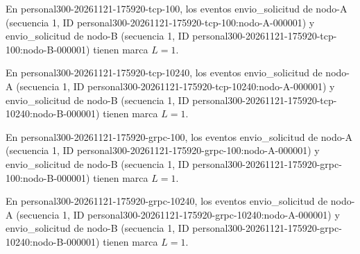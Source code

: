 En personal300-20261121-175920-tcp-100, los eventos envio\_solicitud de nodo-A (secuencia 1, ID personal300-20261121-175920-tcp-100:nodo-A-000001) y envio\_solicitud de nodo-B (secuencia 1, ID personal300-20261121-175920-tcp-100:nodo-B-000001) tienen marca $L=1$.

En personal300-20261121-175920-tcp-10240, los eventos envio\_solicitud de nodo-A (secuencia 1, ID personal300-20261121-175920-tcp-10240:nodo-A-000001) y envio\_solicitud de nodo-B (secuencia 1, ID personal300-20261121-175920-tcp-10240:nodo-B-000001) tienen marca $L=1$.

En personal300-20261121-175920-grpc-100, los eventos envio\_solicitud de nodo-A (secuencia 1, ID personal300-20261121-175920-grpc-100:nodo-A-000001) y envio\_solicitud de nodo-B (secuencia 1, ID personal300-20261121-175920-grpc-100:nodo-B-000001) tienen marca $L=1$.

En personal300-20261121-175920-grpc-10240, los eventos envio\_solicitud de nodo-A (secuencia 1, ID personal300-20261121-175920-grpc-10240:nodo-A-000001) y envio\_solicitud de nodo-B (secuencia 1, ID personal300-20261121-175920-grpc-10240:nodo-B-000001) tienen marca $L=1$.
